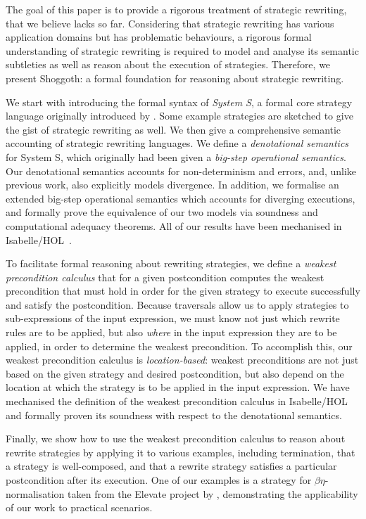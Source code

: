 The goal of this paper is to provide a rigorous treatment of strategic rewriting, that we believe lacks so far. Considering that strategic rewriting has various application domains but has problematic behaviours, a rigorous formal understanding of strategic rewriting is required to model and analyse its semantic subtleties as well as reason about the execution of strategies. Therefore, we present Shoggoth: a formal foundation for reasoning about strategic rewriting.

We start with introducing the formal syntax of \emph{System S}, a formal core strategy language
originally introduced by \citet{VISSER1998422}. Some example strategies are sketched to give the gist of strategic rewriting as well. We then give a comprehensive semantic
accounting of strategic rewriting languages. We define a \emph{denotational semantics} for System
S, which originally had been given
a \emph{big-step operational semantics}. Our denotational semantics accounts for non-determinism and errors, and, unlike previous work, also explicitly models divergence.
In addition, we formalise an extended big-step operational semantics which accounts for diverging executions, and formally prove the equivalence of our two models via soundness and computational adequacy theorems. All of our results have been mechanised in Isabelle/HOL~\citep{NipkowPauWen:IsabelleTut:2002}.

To facilitate formal reasoning about rewriting strategies, we define a \emph{weakest precondition calculus} that for a given postcondition computes the weakest precondition that must hold in order for the given strategy to execute successfully and satisfy the postcondition. Because traversals allow us to apply strategies to sub-expressions of the input expression, we must know not just which rewrite rules are to be applied, but also \emph{where} in the input expression they are to be applied, in order to determine the weakest precondition. To accomplish this, our weakest precondition calculus is \emph{location-based}: weakest preconditions are not just based on the given strategy and desired postcondition, but also depend on the location at which the strategy is to be applied in the input expression. We have mechanised the definition of the weakest precondition calculus in Isabelle/HOL and formally proven its soundness with respect to the denotational semantics. 

Finally, we show how to use the weakest precondition calculus to reason about rewrite strategies by applying it to various examples, including termination, that a strategy is well-composed, and that a rewrite strategy satisfies a particular postcondition after its execution.
One of our examples is a strategy for $\beta\eta$-normalisation taken from the Elevate project by \citet{DBLP:journals/pacmpl/HagedornLKQGS20}, demonstrating the applicability of our work to practical scenarios.

